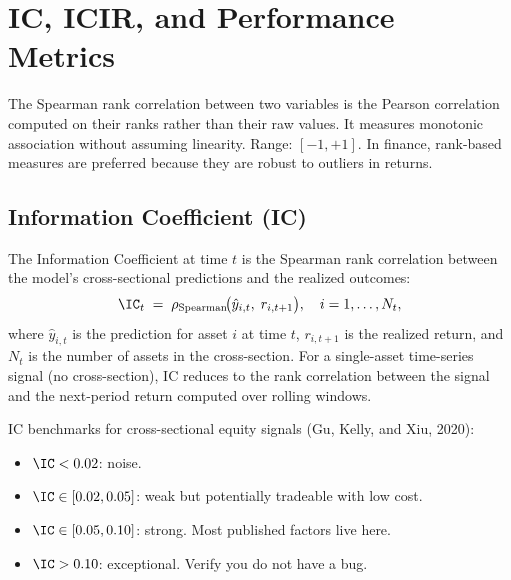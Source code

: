 \section{IC, ICIR, and Performance Metrics}
\label{sec:metrics}

\begin{prereq}
The Spearman rank correlation between two variables is the Pearson correlation computed on their ranks rather than their raw values.  It measures monotonic association without assuming linearity.  Range: $[-1, +1]$.  In finance, rank-based measures are preferred because they are robust to outliers in returns.
\end{prereq}

\subsection{Information Coefficient (IC)}

\begin{definition}
The Information Coefficient at time $t$ is the Spearman rank correlation between the model's cross-sectional predictions and the realized outcomes:
\begin{equation}
\label{eq:ic}
\IC_t \;=\; \rho_{\text{Spearman}}\!\bigl(\hat{y}_{i,t},\; r_{i,t+1}\bigr), \quad i = 1, \ldots, N_t,
\end{equation}
where $\hat{y}_{i,t}$ is the prediction for asset $i$ at time $t$, $r_{i,t+1}$ is the realized return, and $N_t$ is the number of assets in the cross-section.  For a single-asset time-series signal (no cross-section), IC reduces to the rank correlation between the signal and the next-period return computed over rolling windows.
\end{definition}

IC benchmarks for cross-sectional equity signals (Gu, Kelly, and Xiu, 2020):
\begin{itemize}[nosep]
  \item $\IC < 0.02$: noise.
  \item $\IC \in [0.02, 0.05]$: weak but potentially tradeable with low cost.
  \item $\IC \in [0.05, 0.10]$: strong.  Most published factors live here.
  \item $\IC > 0.10$: exceptional.  Verify you do not have a bug.
\end{itemize}

